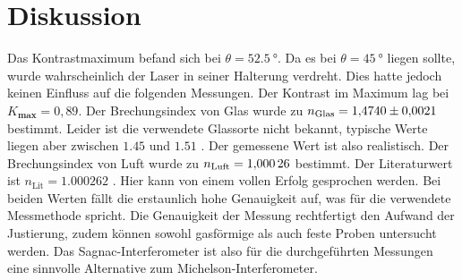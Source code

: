 \section{Diskussion}
Das Kontrastmaximum befand sich bei $\theta = \SI{52.5}{°}$. Da es bei $\theta = \SI{45}{°}$ liegen sollte, wurde wahrscheinlich der Laser in seiner Halterung verdreht. Dies hatte jedoch keinen Einfluss auf die folgenden Messungen. Der Kontrast im Maximum lag bei $K_\textbf{max} = 0,89$.
Der Brechungsindex von Glas wurde zu
$n_\text{Glas}=\num{1,474 \pm 0,0021}$
bestimmt.
Leider ist die verwendete Glassorte nicht bekannt,
typische Werte liegen aber zwischen $\num{1,45}$ und
 $\num{1,51}$ \cite{filmetrics}. Der gemessene Wert ist also realistisch.
Der Brechungsindex von Luft wurde zu $n_\text{Luft}=\num{1,00026 \pm 0,00000}$ bestimmt. Der Literaturwert ist $n_\text{Lit}=\num{1,000262}$ \cite{spektrum}. Hier kann von
einem vollen Erfolg gesprochen werden. Bei beiden Werten fällt die erstaunlich hohe Genauigkeit auf, was für die verwendete Messmethode spricht. Die Genauigkeit der Messung rechtfertigt den Aufwand der Justierung, zudem können sowohl gasförmige als auch feste Proben untersucht werden. Das Sagnac-Interferometer ist also für die durchgeführten Messungen eine sinnvolle Alternative zum Michelson-Interferometer.
\label{sec:Diskussion}
